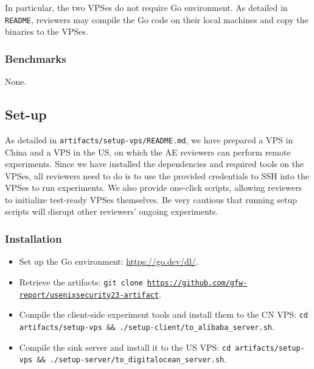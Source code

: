 In particular, the two VPSes do not require Go environment. 
As detailed in \texttt{README},
reviewers may compile the Go code on their local machines and copy the binaries to the VPSes.

\subsubsection{Benchmarks}
None.

\subsection{Set-up}


As detailed in \texttt{artifacts/setup-vps/README.md}, 
we have prepared a VPS in China and a VPS in the US,
on which the AE reviewers can perform remote experiments.
Since we have installed the dependencies and required tools on the VPSes,
all reviewers need to do is to use the provided credentials to SSH into the VPSes
to run experiments.
We also provide one-click scripts, allowing reviewers to initialize test-ready VPSes themselves.
Be very cautious that running setup scripts will disrupt other reviewers' ongoing experiments.

\subsubsection{Installation}

\begin{itemize}
    \item Set up the Go environment: \url{https://go.dev/dl/}.
    \item Retrieve the artifacts:
    \texttt{git clone \url{https://github.com/gfw-report/usenixsecurity23-artifact}}.
    \item Compile the client-side experiment tools and install them to the CN VPS:
    \texttt{cd artifacts/setup-vps \&\& ./setup-client/to\_alibaba\_server.sh}.
    \item Compile the sink server and install it to the US VPS:
    \texttt{cd artifacts/setup-vps \&\& ./setup-server/to\_digitalocean\_server.sh}.
\end{itemize}

